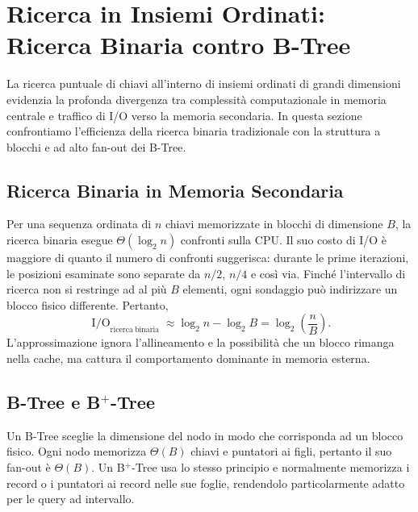 \FloatBarrier
\section{Ricerca in Insiemi Ordinati: Ricerca Binaria contro B-Tree}
\label{sec:binary-search-btrees}

La ricerca puntuale di chiavi all'interno di insiemi ordinati di grandi dimensioni evidenzia la profonda divergenza tra complessit\`a computazionale in memoria centrale e traffico di I/O verso la memoria secondaria. In questa sezione confrontiamo l'efficienza della ricerca binaria tradizionale con la struttura a blocchi e ad alto fan-out dei B-Tree.

\FloatBarrier
\subsection{Ricerca Binaria in Memoria Secondaria}
\label{subsec:external-binary-search}

Per una sequenza ordinata di $n$ chiavi memorizzate in blocchi di dimensione $B$, la ricerca binaria esegue $\Theta(\log_2 n)$ confronti sulla CPU. Il suo costo di I/O è maggiore di quanto il numero di confronti suggerisca: durante le prime iterazioni, le posizioni esaminate sono separate da $n/2$, $n/4$ e così via. Finché l'intervallo di ricerca non si restringe ad al più $B$ elementi, ogni sondaggio può indirizzare un blocco fisico differente. Pertanto,
\[
  \operatorname{I/O}_{\mathrm{ricerca\ binaria}}
  \approx \log_2 n-\log_2 B
  = \log_2\!\left(\frac{n}{B}\right).
\]
L'approssimazione ignora l'allineamento e la possibilità che un blocco rimanga nella cache, ma cattura il comportamento dominante in memoria esterna.

\FloatBarrier
\subsection{B-Tree e \texorpdfstring{B$^+$-Tree}{B+-Tree}}
\label{subsec:btree}

Un B-Tree sceglie la dimensione del nodo in modo che corrisponda ad un blocco fisico. Ogni nodo memorizza $\Theta(B)$ chiavi e puntatori ai figli, pertanto il suo fan-out è $\Theta(B)$. Un B$^+$-Tree usa lo stesso principio e normalmente memorizza i record o i puntatori ai record nelle sue foglie, rendendolo particolarmente adatto per le query ad intervallo.

